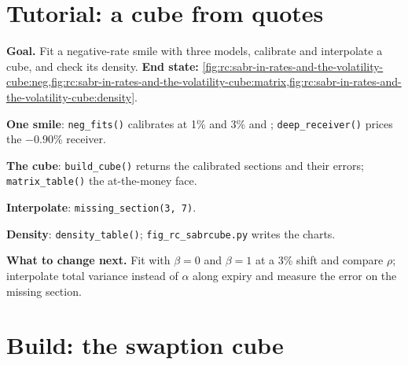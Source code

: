 \section{Tutorial: a cube from quotes}\label{tut:rc:sabr-in-rates-and-the-volatility-cube:tutorial}

\begin{tutorial}
\textbf{Goal.} Fit a negative-rate smile with three models, calibrate and
interpolate a cube, and check its density. \textbf{End state:}
\cref{fig:rc:sabr-in-rates-and-the-volatility-cube:neg,fig:rc:sabr-in-rates-and-the-volatility-cube:matrix,fig:rc:sabr-in-rates-and-the-volatility-cube:density}.
\begin{tutsteps}
\item \textbf{One smile}: \texttt{neg\_fits()} calibrates  at 1\% and
3\% and ; \texttt{deep\_receiver()} prices the $-0.90\%$ receiver.
\item \textbf{The cube}: \texttt{build\_cube()} returns the calibrated sections and
their errors; \texttt{matrix\_table()} the at-the-money face.
\item \textbf{Interpolate}: \texttt{missing\_section(3, 7)}.
\item \textbf{Density}: \texttt{density\_table()}; \texttt{fig\_rc\_sabrcube.py}
writes the charts.
\end{tutsteps}
\textbf{What to change next.} Fit with $\beta=0$ and $\beta=1$ at a 3\% shift and
compare $\rho$; interpolate total variance instead of $\alpha$ along expiry and
measure the error on the missing section.
\end{tutorial}

\section{Build: the swaption cube}\label{bld:rc:sabr-in-rates-and-the-volatility-cube:sabrcube}

